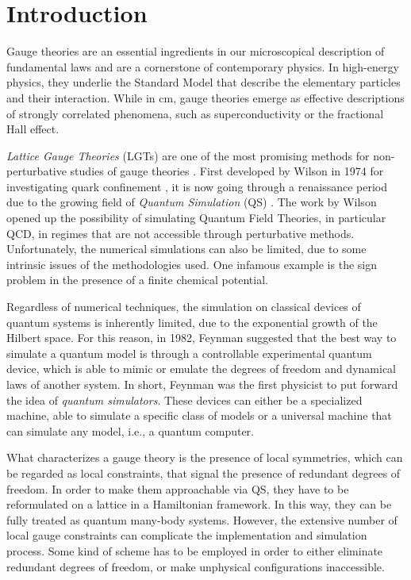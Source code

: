 \newpage

\chapter*{Introduction}
\label{chap:introduction}

Gauge theories are an essential ingredients in our microscopical description of fundamental laws and are a cornerstone of contemporary physics.
In high-energy physics, they underlie the Standard Model that describe the elementary particles and their interaction.
While in \ac{cm}, gauge theories emerge as effective descriptions of strongly correlated phenomena, such as superconductivity or the fractional Hall effect.

\emph{Lattice Gauge Theories} (LGTs) are one of the most promising methods for non-perturbative studies of gauge theories \cite{banuls2020simulating}.
First developed by Wilson in 1974 for investigating quark confinement \cite{wilson1974confinement}, it is now going through a renaissance period due to the growing field of \emph{Quantum Simulation} (QS) \cite{cirac2012goals}.
The work by Wilson opened up the possibility of simulating Quantum Field Theories, in particular QCD, in regimes that are not accessible through perturbative methods.
Unfortunately, the numerical simulations can also be limited, due to some intrinsic issues of the methodologies used.
One infamous example is the sign problem in the presence of a finite chemical potential.

Regardless of numerical techniques, the simulation on classical devices of quantum systems is inherently limited, due to the exponential growth of the Hilbert space.
For this reason, in 1982, Feynman \cite{feynman1982simulation} suggested that the best way to simulate a quantum model is through a controllable experimental quantum device, which is able to mimic or emulate the degrees of freedom and dynamical laws of another system.
In short, Feynman was the first physicist to put forward the idea of \emph{quantum simulators}.
These devices can either be a specialized machine, able to simulate a specific class of models or a universal machine that can simulate any model, i.e., a quantum computer.

\medskip

What characterizes a gauge theory is the presence of local symmetries, which can be regarded as local constraints, that signal the presence of redundant degrees of freedom.
In order to make them approachable via QS, they have to be reformulated on a lattice in a Hamiltonian framework.
In this way, they can be fully treated as quantum many-body systems.
However, the extensive number of local gauge constraints can complicate the implementation and simulation process.
Some kind of scheme has to be employed in order to either eliminate redundant degrees of freedom, or make unphysical configurations inaccessible.

